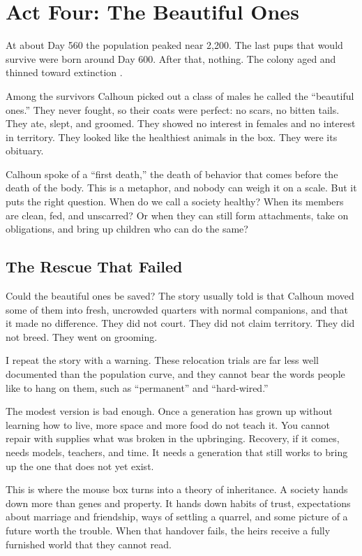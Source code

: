 \documentclass[12pt,a4paper]{book}
\begin{document}
\section{Act Four: The Beautiful Ones}

At about Day 560 the population peaked near 2,200. The last pups that would survive were born around Day 600. After that, nothing. The colony aged and thinned toward extinction \cite{calhoun1973}.

Among the survivors Calhoun picked out a class of males he called the ``beautiful ones.'' They never fought, so their coats were perfect: no scars, no bitten tails. They ate, slept, and groomed. They showed no interest in females and no interest in territory. They looked like the healthiest animals in the box. They were its obituary.

Calhoun spoke of a ``first death,'' the death of behavior that comes before the death of the body. This is a metaphor, and nobody can weigh it on a scale. But it puts the right question. When do we call a society healthy? When its members are clean, fed, and unscarred? Or when they can still form attachments, take on obligations, and bring up children who can do the same?

\subsection{The Rescue That Failed}

Could the beautiful ones be saved? The story usually told is that Calhoun moved some of them into fresh, uncrowded quarters with normal companions, and that it made no difference. They did not court. They did not claim territory. They did not breed. They went on grooming.

I repeat the story with a warning. These relocation trials are far less well documented than the population curve, and they cannot bear the words people like to hang on them, such as ``permanent'' and ``hard-wired.''

The modest version is bad enough. Once a generation has grown up without learning how to live, more space and more food do not teach it. You cannot repair with supplies what was broken in the upbringing. Recovery, if it comes, needs models, teachers, and time. It needs a generation that still works to bring up the one that does not yet exist.

This is where the mouse box turns into a theory of inheritance. A society hands down more than genes and property. It hands down habits of trust, expectations about marriage and friendship, ways of settling a quarrel, and some picture of a future worth the trouble. When that handover fails, the heirs receive a fully furnished world that they cannot read.
\end{document}
